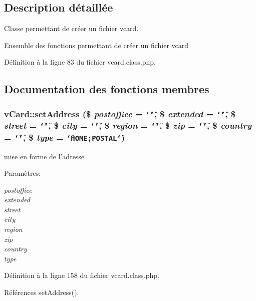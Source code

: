 \subsection{Description d\'{e}taill\'{e}e}
Classe permettant de cr\'{e}er un fichier vcard. 

Ensemble des fonctions permettant de cr\'{e}er un fichier vcard 



D\'{e}finition \`{a} la ligne 83 du fichier vcard.class.php.

\subsection{Documentation des fonctions membres}
\hypertarget{classvCard_a5}{
\subsubsection[setAddress]{\setlength{\rightskip}{0pt plus 5cm}v\-Card::set\-Address (\$ {\em postoffice} = {\tt \char`\"{}\char`\"{}}, \$ {\em extended} = {\tt \char`\"{}\char`\"{}}, \$ {\em street} = {\tt \char`\"{}\char`\"{}}, \$ {\em city} = {\tt \char`\"{}\char`\"{}}, \$ {\em region} = {\tt \char`\"{}\char`\"{}}, \$ {\em zip} = {\tt \char`\"{}\char`\"{}}, \$ {\em country} = {\tt \char`\"{}\char`\"{}}, \$ {\em type} = {\tt \char`\"{}HOME;POSTAL\char`\"{}})}}
\label{classvCard_a5}


mise en forme de l'adresse 

\begin{Desc}
\item[Param\`{e}tres:]
\begin{description}
\item[{\em postoffice}]\item[{\em extended}]\item[{\em street}]\item[{\em city}]\item[{\em region}]\item[{\em zip}]\item[{\em country}]\item[{\em type}]\end{description}
\end{Desc}


D\'{e}finition \`{a} la ligne 158 du fichier vcard.class.php.

R\'{e}f\'{e}rences set\-Address().

